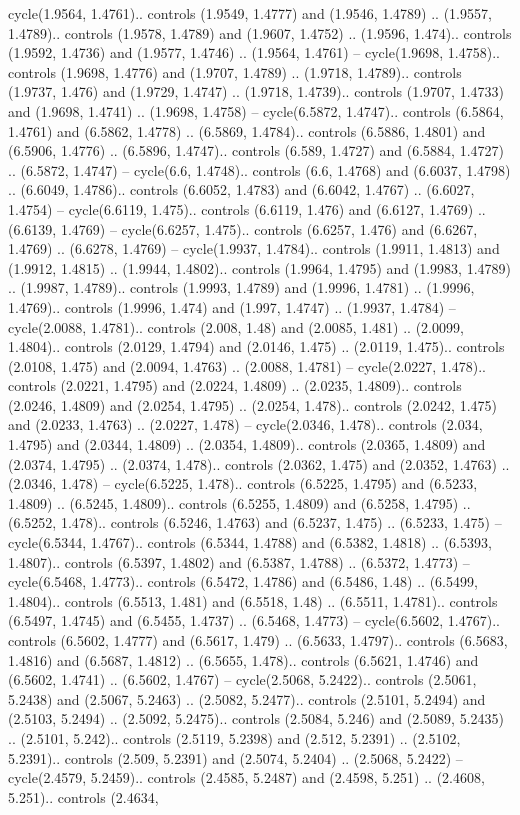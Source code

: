 cycle(1.9564, 1.4761).. controls (1.9549, 1.4777) and (1.9546, 1.4789) .. (1.9557, 1.4789).. controls (1.9578, 1.4789) and (1.9607, 1.4752) .. (1.9596, 1.474).. controls (1.9592, 1.4736) and (1.9577, 1.4746) .. (1.9564, 1.4761) -- cycle(1.9698, 1.4758).. controls (1.9698, 1.4776) and (1.9707, 1.4789) .. (1.9718, 1.4789).. controls (1.9737, 1.476) and (1.9729, 1.4747) .. (1.9718, 1.4739).. controls (1.9707, 1.4733) and (1.9698, 1.4741) .. (1.9698, 1.4758) -- cycle(6.5872, 1.4747).. controls (6.5864, 1.4761) and (6.5862, 1.4778) .. (6.5869, 1.4784).. controls (6.5886, 1.4801) and (6.5906, 1.4776) .. (6.5896, 1.4747).. controls (6.589, 1.4727) and (6.5884, 1.4727) .. (6.5872, 1.4747) -- cycle(6.6, 1.4748).. controls (6.6, 1.4768) and (6.6037, 1.4798) .. (6.6049, 1.4786).. controls (6.6052, 1.4783) and (6.6042, 1.4767) .. (6.6027, 1.4754) -- cycle(6.6119, 1.475).. controls (6.6119, 1.476) and (6.6127, 1.4769) .. (6.6139, 1.4769) -- cycle(6.6257, 1.475).. controls (6.6257, 1.476) and (6.6267, 1.4769) .. (6.6278, 1.4769) -- cycle(1.9937, 1.4784).. controls (1.9911, 1.4813) and (1.9912, 1.4815) .. (1.9944, 1.4802).. controls (1.9964, 1.4795) and (1.9983, 1.4789) .. (1.9987, 1.4789).. controls (1.9993, 1.4789) and (1.9996, 1.4781) .. (1.9996, 1.4769).. controls (1.9996, 1.474) and (1.997, 1.4747) .. (1.9937, 1.4784) -- cycle(2.0088, 1.4781).. controls (2.008, 1.48) and (2.0085, 1.481) .. (2.0099, 1.4804).. controls (2.0129, 1.4794) and (2.0146, 1.475) .. (2.0119, 1.475).. controls (2.0108, 1.475) and (2.0094, 1.4763) .. (2.0088, 1.4781) -- cycle(2.0227, 1.478).. controls (2.0221, 1.4795) and (2.0224, 1.4809) .. (2.0235, 1.4809).. controls (2.0246, 1.4809) and (2.0254, 1.4795) .. (2.0254, 1.478).. controls (2.0242, 1.475) and (2.0233, 1.4763) .. (2.0227, 1.478) -- cycle(2.0346, 1.478).. controls (2.034, 1.4795) and (2.0344, 1.4809) .. (2.0354, 1.4809).. controls (2.0365, 1.4809) and (2.0374, 1.4795) .. (2.0374, 1.478).. controls (2.0362, 1.475) and (2.0352, 1.4763) .. (2.0346, 1.478) -- cycle(6.5225, 1.478).. controls (6.5225, 1.4795) and (6.5233, 1.4809) .. (6.5245, 1.4809).. controls (6.5255, 1.4809) and (6.5258, 1.4795) .. (6.5252, 1.478).. controls (6.5246, 1.4763) and (6.5237, 1.475) .. (6.5233, 1.475) -- cycle(6.5344, 1.4767).. controls (6.5344, 1.4788) and (6.5382, 1.4818) .. (6.5393, 1.4807).. controls (6.5397, 1.4802) and (6.5387, 1.4788) .. (6.5372, 1.4773) -- cycle(6.5468, 1.4773).. controls (6.5472, 1.4786) and (6.5486, 1.48) .. (6.5499, 1.4804).. controls (6.5513, 1.481) and (6.5518, 1.48) .. (6.5511, 1.4781).. controls (6.5497, 1.4745) and (6.5455, 1.4737) .. (6.5468, 1.4773) -- cycle(6.5602, 1.4767).. controls (6.5602, 1.4777) and (6.5617, 1.479) .. (6.5633, 1.4797).. controls (6.5683, 1.4816) and (6.5687, 1.4812) .. (6.5655, 1.478).. controls (6.5621, 1.4746) and (6.5602, 1.4741) .. (6.5602, 1.4767) -- cycle(2.5068, 5.2422).. controls (2.5061, 5.2438) and (2.5067, 5.2463) .. (2.5082, 5.2477).. controls (2.5101, 5.2494) and (2.5103, 5.2494) .. (2.5092, 5.2475).. controls (2.5084, 5.246) and (2.5089, 5.2435) .. (2.5101, 5.242).. controls (2.5119, 5.2398) and (2.512, 5.2391) .. (2.5102, 5.2391).. controls (2.509, 5.2391) and (2.5074, 5.2404) .. (2.5068, 5.2422) -- cycle(2.4579, 5.2459).. controls (2.4585, 5.2487) and (2.4598, 5.251) .. (2.4608, 5.251).. controls (2.4634, 